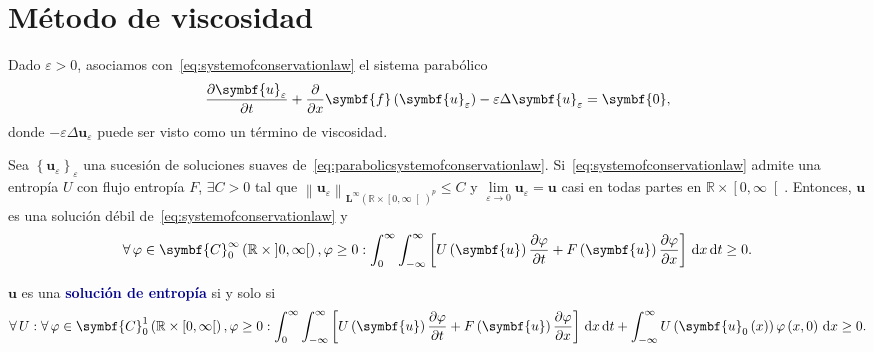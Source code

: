 \section{Método de viscosidad}

Dado $\varepsilon>0$, asociamos
con~\eqref{eq:systemofconservationlaw} el sistema parabólico
\begin{equation}\label{eq:parabolicsystemofconservationlaw}
	\diffp{\symbf{u}_{\varepsilon}}{t}+
	\diffp{}{x}
	\symbf{f}
	\left(\symbf{u}_{\varepsilon}\right)-
	\varepsilon
	\Delta\symbf{u}_{\varepsilon}=
	\symbf{0},
\end{equation}
donde $-\varepsilon\Delta\symbf{u}_{\varepsilon}$ puede ser visto
como un término de viscosidad.

\begin{theorem}
	Sea
	\begin{math}
		\left\{\symbf{u}_{\varepsilon}\right\}_{\varepsilon}
	\end{math}
	una sucesión de soluciones suaves
	de~\eqref{eq:parabolicsystemofconservationlaw}.
	Si~\eqref{eq:systemofconservationlaw} admite una entropía
	$U$ con flujo entropía $F$, $\exists C>0$ tal que
	\begin{math}
		{
			\left\|\symbf{u}_{\varepsilon}\right\|
		}_{
			{\symbf{L}^{\infty}\left(\mathbb{R}\times\left[0,\infty\right[\right)}^{p}
		}\leq C
	\end{math}
	y $\lim\limits_{\varepsilon\to0}\symbf{u}_{\varepsilon}=\symbf{u}$
	casi en todas partes en $\mathbb{R}\times\left[0,\infty\right[$.
	Entonces, $\symbf{u}$ es una solución débil
	de~\eqref{eq:systemofconservationlaw} y
	\begin{equation*}
		\forall\varphi\in
		\symbf{C}^{\infty}_{0}
		\left(\mathbb{R}\times\left]0,\infty\right[\right),
		\varphi\geq 0:
		\int_{0}^{\infty}
		\int_{-\infty}^{\infty}
		\left[
			U\left(\symbf{u}\right)
			\diffp{\varphi}{t}+
			F\left(\symbf{u}\right)
			\diffp{\varphi}{x}
			\right]
		\dl x\dl t\geq
		0.
	\end{equation*}
\end{theorem}

\begin{definition}
	$\symbf{u}$ es una
	\textcolor{DarkBlue}{\bfseries solución de entropía}
	 si y solo si
	\begin{equation*}
		\forall U:
		\forall\varphi\in
		\symbf{C}^{1}_{0}
		\left(\mathbb{R}\times\left[0,\infty\right[\right),
		\varphi\geq 0:
		\int_{0}^{\infty}
		\int_{-\infty}^{\infty}
		\left[
			U\left(\symbf{u}\right)
			\diffp{\varphi}{t}+
			F\left(\symbf{u}\right)
			\diffp{\varphi}{x}
			\right]
		\dl x\dl t+
		\int_{-\infty}^{\infty}
		U\left(\symbf{u}_{0}\left(x\right)\right)
		\varphi\left(x,0\right)\dl x\geq
		0.
	\end{equation*}
\end{definition}

